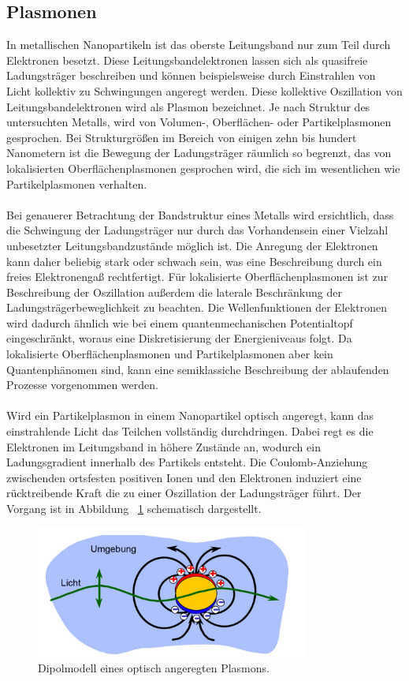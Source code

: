 \subsection{Plasmonen}
In metallischen Nanopartikeln ist das oberste Leitungsband nur zum Teil durch Elektronen besetzt. Diese Leitungsbandelektronen lassen sich als quasifreie Ladungsträger beschreiben und können beispielsweise durch Einstrahlen von Licht kollektiv zu Schwingungen angeregt werden. Diese kollektive Oszillation von Leitungsbandelektronen wird als Plasmon bezeichnet. Je nach Struktur des untersuchten Metalls, wird von Volumen-, Oberflächen- oder Partikelplasmonen gesprochen. Bei Strukturgrößen im Bereich von einigen zehn bis hundert Nanometern ist die Bewegung der Ladungsträger räumlich so begrenzt, das von lokalisierten Oberflächenplasmonen gesprochen wird, die sich im wesentlichen wie Partikelplasmonen verhalten.\\
\\
Bei genauerer Betrachtung der Bandstruktur eines Metalls wird ersichtlich, dass die Schwingung der Ladungsträger nur durch das Vorhandensein einer Vielzahl unbesetzter Leitungsbandzustände möglich ist. Die Anregung der Elektronen kann daher beliebig stark oder schwach sein, was eine Beschreibung durch ein freies Elektronengaß rechtfertigt. Für lokalisierte Oberflächenplasmonen ist zur Beschreibung der Oszillation außerdem die laterale Beschränkung der Ladungsträgerbeweglichkeit zu beachten. Die Wellenfunktionen der Elektronen wird dadurch ähnlich wie bei einem quantenmechanischen Potentialtopf eingeschränkt, woraus eine Diskretisierung der Energieniveaus folgt. Da lokalisierte Oberflächenplasmonen und Partikelplasmonen aber kein Quantenphänomen sind, kann eine semiklassiche Beschreibung der ablaufenden Prozesse vorgenommen werden.\\
\\
Wird ein Partikelplasmon in einem Nanopartikel optisch angeregt, kann das einstrahlende Licht das Teilchen vollständig durchdringen. Dabei regt es die Elektronen im Leitungsband in höhere Zustände an, wodurch ein Ladungsgradient innerhalb des Partikels entsteht. Die Coulomb-Anziehung zwischenden ortsfesten positiven Ionen und den Elektronen induziert eine rücktreibende Kraft die zu einer Oszillation der Ladungsträger führt. Der Vorgang ist in Abbildung ~\ref{fig:dipol} schematisch dargestellt.
\begin{figure}[H]
  \centering
  \includegraphics[width=0.8\textwidth]{plots/dipolplamson.jpg}
  \caption{Dipolmodell eines optisch angeregten Plasmons. \cite{anleitung}}
  \label{fig:dipol}
\end{figure}
